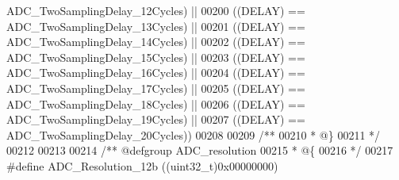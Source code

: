 \begin{DoxyCode}
      ADC_TwoSamplingDelay_12Cycles\textcolor{preprocessor}{)} \textcolor{preprocessor}{||}
00200                                       \textcolor{preprocessor}{(}\textcolor{preprocessor}{(}\textcolor{preprocessor}{DELAY}\textcolor{preprocessor}{)} \textcolor{preprocessor}{==} 
      ADC_TwoSamplingDelay_13Cycles\textcolor{preprocessor}{)} \textcolor{preprocessor}{||}
00201                                       \textcolor{preprocessor}{(}\textcolor{preprocessor}{(}\textcolor{preprocessor}{DELAY}\textcolor{preprocessor}{)} \textcolor{preprocessor}{==} 
      ADC_TwoSamplingDelay_14Cycles\textcolor{preprocessor}{)} \textcolor{preprocessor}{||}
00202                                       \textcolor{preprocessor}{(}\textcolor{preprocessor}{(}\textcolor{preprocessor}{DELAY}\textcolor{preprocessor}{)} \textcolor{preprocessor}{==} 
      ADC_TwoSamplingDelay_15Cycles\textcolor{preprocessor}{)} \textcolor{preprocessor}{||}
00203                                       \textcolor{preprocessor}{(}\textcolor{preprocessor}{(}\textcolor{preprocessor}{DELAY}\textcolor{preprocessor}{)} \textcolor{preprocessor}{==} 
      ADC_TwoSamplingDelay_16Cycles\textcolor{preprocessor}{)} \textcolor{preprocessor}{||}
00204                                       \textcolor{preprocessor}{(}\textcolor{preprocessor}{(}\textcolor{preprocessor}{DELAY}\textcolor{preprocessor}{)} \textcolor{preprocessor}{==} 
      ADC_TwoSamplingDelay_17Cycles\textcolor{preprocessor}{)} \textcolor{preprocessor}{||}
00205                                       \textcolor{preprocessor}{(}\textcolor{preprocessor}{(}\textcolor{preprocessor}{DELAY}\textcolor{preprocessor}{)} \textcolor{preprocessor}{==} 
      ADC_TwoSamplingDelay_18Cycles\textcolor{preprocessor}{)} \textcolor{preprocessor}{||}
00206                                       \textcolor{preprocessor}{(}\textcolor{preprocessor}{(}\textcolor{preprocessor}{DELAY}\textcolor{preprocessor}{)} \textcolor{preprocessor}{==} 
      ADC_TwoSamplingDelay_19Cycles\textcolor{preprocessor}{)} \textcolor{preprocessor}{||}
00207                                       \textcolor{preprocessor}{(}\textcolor{preprocessor}{(}\textcolor{preprocessor}{DELAY}\textcolor{preprocessor}{)} \textcolor{preprocessor}{==} 
      ADC_TwoSamplingDelay_20Cycles\textcolor{preprocessor}{)}\textcolor{preprocessor}{)}
00208 
00209 \textcolor{comment}{/**}
00210 \textcolor{comment}{  * @\}}
00211 \textcolor{comment}{  */}
00212 
00213 
00214 \textcolor{comment}{/** @defgroup ADC\_resolution }
00215 \textcolor{comment}{  * @\{}
00216 \textcolor{comment}{  */}
00217 \textcolor{preprocessor}{#}\textcolor{preprocessor}{define} \textcolor{preprocessor}{ADC\_Resolution\_12b}                         \textcolor{preprocessor}{(}\textcolor{preprocessor}{(}\textcolor{preprocessor}{uint32\_t}\textcolor{preprocessor}{)}0x00000000\textcolor{preprocessor}{)}

\end{DoxyCode}
